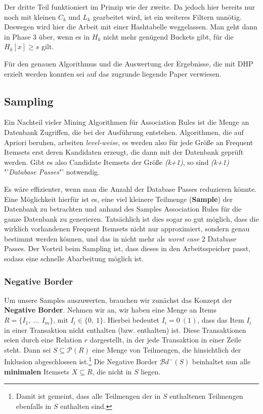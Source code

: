 Der dritte Teil funktioniert im Prinzip wie der zweite. Da jedoch hier bereits
nur noch mit kleinen \(C_k\) und \(L_k\) gearbeitet wird, ist ein weiteres Filtern
unnötig. Deswegen wird hier die Arbeit mit einer Hashtabelle weggelassen. Man geht
dann in Phase 3 über, wenn es in \(H_k\) nicht mehr genügend Buckets gibt, für die
\(H_k[x] \geq s\) gilt.

Für den genauen Algorithmus und die Auswertung der Ergebnisse, die mit DHP erzielt
werden konnten sei auf das zugrunde liegende Paper verwiesen.

\subsection{Sampling}
Ein Nachteil vieler Mining Algorithmen für Association Rules ist die Menge an
Datenbank Zugriffen, die bei der Ausführung entstehen. Algorithmen, die auf 
Apriori beruhen, arbeiten \textit{level-weise}, es werden also für jede Größe
an Frequent Itemsets erst deren Kandidaten erzeugt, die dann mit der Datenbank
geprüft werden. Gibt es also Candidate Itemsets der Größe \textit{(k+1)}, so 
sind \textit{(k+1)} "'\textit{Database Passes}"' notwendig.

Es wäre effizienter, wenn man die Anzahl der Database Passes reduzieren könnte.
Eine Möglichkeit hierfür ist es, eine viel kleinere Teilmenge (\textbf{Sample})
der Datenbank zu betrachten und anhand des Samples Association Rules für die
ganze Datenbank zu generieren. Tatsächlich ist dies sogar so gut möglich, dass
die wirklich vorhandenen Frequent Itemsets nicht nur approximiert, sondern genau
bestimmt werden können, und das in nicht mehr als \textit{worst case} 2 Database
Passes.
Der Vorteil beim Sampling ist, dass dieses in den Arbeitsspeicher passt, sodass
eine schnelle Abarbeitung möglich ist.

\subsubsection{Negative Border}
Um unsere Samples auszuwerten, brauchen wir zunächst das Konzept der \textbf{Negative
Border}. Nehmen wir an, wir haben eine Menge an Items \(R = \{I_1,\ \dots\,\ I_m\}\),
mit \(I_i \in \{0,\ 1\}\). Hierbei bedeutet \(I_i = 0\ (1)\), dass das Item \(I_i\)
in einer Transaktion nicht enthalten (bzw. enthalten) ist. Diese Transaktionen seien
durch eine Relation \(r\) dargestellt, in der jede Transaktion in einer Zeile steht.
Dann sei \(S\subseteq
\mathcal{P}(R)\) eine Menge von Teilmengen, die hinsichtlich der Inklusion 
abgeschlossen ist.\footnote{Damit ist gemeint, dass alle Teilmengen der in \(S\)
enthaltenen Teilmengen ebenfalls in \(S\) enthalten sind.}
Die Negative Border \(\mathcal{B}d^{-}(S)\) beinhaltet nun alle \textbf{minimalen} Itemsets
\(X\subseteq R\), die nicht in \(S\) liegen.

